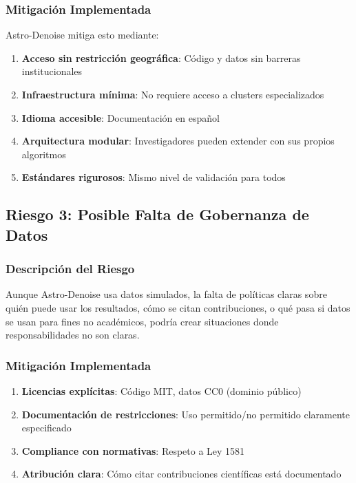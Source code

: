 \subsubsection{Mitigación Implementada}

Astro-Denoise mitiga esto mediante:

\begin{enumerate}
    \item \textbf{Acceso sin restricción geográfica}: Código y datos sin barreras institucionales
    \item \textbf{Infraestructura mínima}: No requiere acceso a clusters especializados
    \item \textbf{Idioma accesible}: Documentación en español
    \item \textbf{Arquitectura modular}: Investigadores pueden extender con sus propios algoritmos
    \item \textbf{Estándares rigurosos}: Mismo nivel de validación para todos
\end{enumerate}

\subsection{Riesgo 3: Posible Falta de Gobernanza de Datos}

\subsubsection{Descripción del Riesgo}

Aunque Astro-Denoise usa datos simulados, la falta de políticas claras sobre quién puede usar los resultados, cómo se citan contribuciones, o qué pasa si datos se usan para fines no académicos, podría crear situaciones donde responsabilidades no son claras.

\subsubsection{Mitigación Implementada}

\begin{enumerate}
    \item \textbf{Licencias explícitas}: Código MIT, datos CC0 (dominio público)
    \item \textbf{Documentación de restricciones}: Uso permitido/no permitido claramente especificado
    \item \textbf{Compliance con normativas}: Respeto a Ley 1581
    \item \textbf{Atribución clara}: Cómo citar contribuciones científicas está documentado
\end{enumerate}

